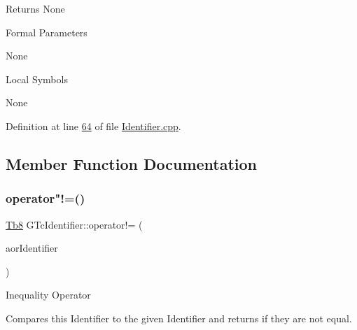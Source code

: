 \begin{DoxyReturn}{Returns}
None
\end{DoxyReturn}
\begin{DoxyParagraph}{Formal Parameters}

\begin{DoxyPre}{\ttfamily  None }\end{DoxyPre}

\end{DoxyParagraph}
\begin{DoxyParagraph}{Local Symbols}

\begin{DoxyPre}{\ttfamily  None }\end{DoxyPre}
 
\end{DoxyParagraph}


Definition at line \mbox{\hyperlink{_identifier_8cpp_source_l00064}{64}} of file \mbox{\hyperlink{_identifier_8cpp_source}{Identifier.\+cpp}}.



\subsection{Member Function Documentation}
\mbox{\label{class_g_n_common_1_1_g_n_notification_1_1_g_tc_identifier_a3a93f5bf62f84d2f11a47b65c3d8fbd3}} 
\subsubsection{\texorpdfstring{operator"!=()}{operator!=()}}
{\footnotesize\ttfamily \mbox{\hyperlink{namespace_g_n_common_a8115dc7ed53b6e5b52e6bfde1632ea74}{Tb8}} G\+Tc\+Identifier\+::operator!= (\begin{DoxyParamCaption}\item[{const \mbox{\hyperlink{class_g_n_common_1_1_g_n_notification_1_1_g_tc_identifier}{G\+Tc\+Identifier}} \&}]{aor\+Identifier }\end{DoxyParamCaption})}

Inequality Operator

Compares this Identifier to the given Identifier and returns if they are not equal.

